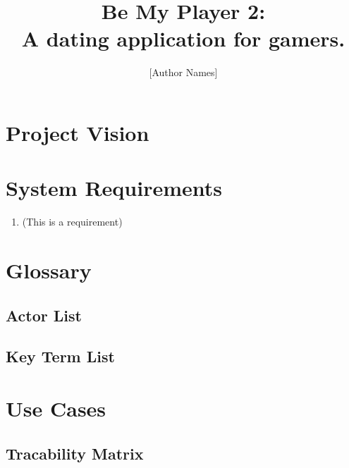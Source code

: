 \documentclass[10pt, draft]{article}
\title{Be My Player 2: \\ A dating application for gamers.}
\author{[Author Names]}
\begin{document}
\maketitle \pagebreak



\section{Project Vision}

\section{System Requirements}
\begin{enumerate}
\item (This is a requirement)
\end{enumerate}

\section{Glossary}

\subsection{Actor List}

\subsection{Key Term List}

\section{Use Cases}

\subsection*{Tracability Matrix}
\end{document}
